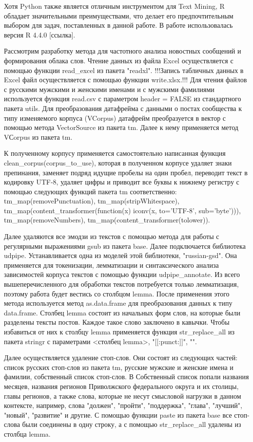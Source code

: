 \documentclass[bachelor, och, coursework ]{SCWorks}
\begin{document}
Хотя Python также является отличным инструментом для Text Mining, R обладает значительными преимуществами, что делает его предпочтительным выбором для задач, поставленных в данной работе. В работе использовалась версия R 4.4.0 [ссылка].



Рассмотрим разработку метода для частотного анализа новостных сообщений и формирования облака слов.
 Чтение данных из файла Excel осуществляется с помощью функции read\_excel из пакета "readxl". 
!!!Запись табличных данных в Excel файл осуществляется с помощью функции write.xlsx.!!!
Для чтения файлов с русскими мужскими и женскими именами и с мужскими фамилиями используется функция read.csv с параметром header = FALSE из стандартного пакета utils. 
Для преобразования датафрейма с данными о постах сообщества к типу изменяемого корпуса (VCorpus) датафрейм преобразуется в вектор с помощью метода VectorSource из пакета tm. Далее к нему применяется метод VСorpus из пакета tm.

К полученному корпусу применяется самостоятельно написанная функция clean\_corpus(corpus\_to\_use), которая в полученном корпусе удаляет знаки препинания, заменяет подряд идущие пробелы на один пробел, переводит текст в кодировку UTF-8, удаляет цифры и приводит все буквы к нижнему регистру с помощью следующих функций пакета tm соответственно: tm\_map(removePunctuation), tm\_map(stripWhitespace), tm\_map(content\_transformer(function(x) iconv(x, to='UTF-8', sub='byte'))), tm\_map(removeNumbers), tm\_map(content\_transformer(tolower)).

Далее удаляются все эмодзи из текстов с помощью метода для работы с регулярными выражениями gsub из пакета base.
Далее подключается библиотека udpipe. Устанавливается одна из моделей этой библиотеки, "russian-gsd". Она применяется для токенизации, лемматизации и синтаксического анализа зависимостей корпуса текстов с помощью функции udpipe\_annotate. Из всего вышеперечисленного для обработки текстов потребуется только лемматизация, поэтому работа будет вестись со столбцом lemma. После применения этого метода используется метод as.data.frame для преобразования данных к типу data.frame. Столбец lemma состоит из начальных форм слов, на которые были разделены тексты постов. Каждое такое слово заключено в кавычки. Чтобы избавиться от них к столбцу lemma применяется функция str\_replace\_all из пакета stringr с параметрами <столбец lemma>, "[[:punct:]]", "".

Далее осуществляется удаление стоп-слов. Они состоят из следующих частей: список русских стоп-слов из пакета tm, русские мужские и женские имена и фамилии, собственный список стоп-слов. В Собственный список попали названия месяцев, названия регионов  Приволжского федерального округа и их столицы, главы регионов, а также слова, которые не несут смысловой нагрузки в данном контексте, например, слова "должен", "пройти", "поддержка", "глава", "лучший", "новый", "развитие" и другие. С помощью функции paste из пакета base все стоп-слова были соединены в одну строку, а с помощью str\_replace\_all удалены из столбца lemma.
\end{document}
